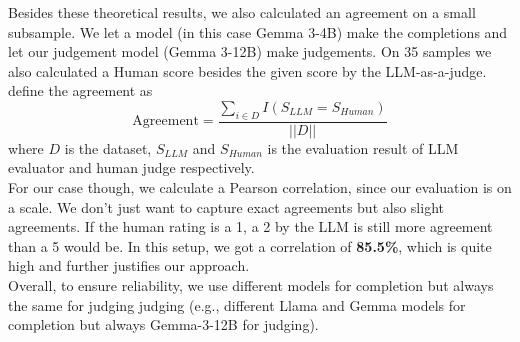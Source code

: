 \documentclass[%
thesis=student,%
coverpage=false,%
titlepage=false,%
headmarks=true, %
english,%
font=libertine, %
math=newpxtx, %
BCOR=5mm,%
coverBCOR=11mm%
]{tum-templates/book/tumbook}
\begin{document}
Besides these theoretical results, we also calculated an agreement on a small subsample. We let a model (in this case Gemma 3-4B) make the completions and let our judgement model (Gemma 3-12B) make judgements. On 35 samples we also calculated a Human score besides the given score by the LLM-as-a-judge.
\textcite{GU2025} define the agreement as 
\begin{equation}
    \text{Agreement} = \frac{\sum_{i \in D} I(S_{LLM} = S_{Human})}{||D||}
\end{equation}
where $D$ is the dataset, $S_{LLM}$ and $S_{Human}$ is the evaluation result of LLM evaluator and human judge respectively. \\
For our case though, we calculate a Pearson correlation, since our evaluation is on a scale. We don't just want to capture exact agreements but also slight agreements. If the human rating is a 1, a 2 by the LLM is still more agreement than a 5 would be. In this setup, we got a correlation of \textbf{85.5\%}, which is quite high and further justifies our approach. \\
Overall, to ensure reliability, we use different models for completion but always the same for judging judging (e.g., different Llama and Gemma models for completion but always Gemma-3-12B for judging).
\end{document}
